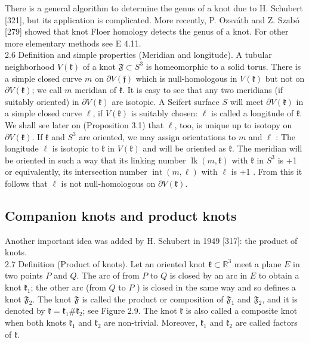 \documentclass[10pt, letterpaper]{article}
\begin{document}
There is a general algorithm to determine the genus of a knot due to H. Schubert [321], but its application is complicated. More recently, P. Ozsváth and Z. Szabó [279] showed that knot Floer homology detects the genus of a knot. For other more elementary methods see E 4.11.\\
2.6 Definition and simple properties (Meridian and longitude). A tubular neighborhood $V(\mathfrak{k})$ of a knot $\mathfrak{F} \subset S^{3}$ is homeomorphic to a solid torus. There is a simple closed curve $m$ on $\partial V(\mathfrak{f})$ which is null-homologous in $V(\mathfrak{k})$ but not on $\partial V(\mathfrak{k})$; we call $m$ meridian of $\mathfrak{k}$. It is easy to see that any two meridians (if suitably oriented) in $\partial V(\mathfrak{k})$ are isotopic. A Seifert surface $S$ will meet $\partial V(\mathfrak{k})$ in a simple closed curve $\ell$, if $V(\mathfrak{k})$ is suitably chosen: $\ell$ is called a longitude of $\mathfrak{k}$. We shall see later on (Proposition 3.1) that $\ell$, too, is unique up to isotopy on $\partial V(\mathfrak{k})$. If $\mathfrak{k}$ and $S^{3}$ are oriented, we may assign orientations to $m$ and $\ell$ : The longitude $\ell$ is isotopic to $\mathfrak{k}$ in $V(\mathfrak{k})$ and will be oriented as $\mathfrak{k}$. The meridian will be oriented in such a way that its linking number $\operatorname{lk}(m, \mathfrak{k})$ with $\mathfrak{k}$ in $S^{3}$ is +1 or equivalently, its intersection number $\operatorname{int}(m, \ell)$ with $\ell$ is +1 . From this it follows that $\ell$ is not null-homologous on $\partial V(\mathfrak{k})$.

\subsection{Companion knots and product knots}
Another important idea was added by H. Schubert in 1949 [317]: the product of knots.\\
2.7 Definition (Product of knots). Let an oriented knot $\mathfrak{k} \subset \mathbb{R}^{3}$ meet a plane $E$ in two points $P$ and $Q$. The arc of from $P$ to $Q$ is closed by an arc in $E$ to obtain a knot $\mathfrak{k}_{1}$; the other arc (from $Q$ to $P$ ) is closed in the same way and so defines a knot $\mathfrak{F}_{2}$. The knot $\mathfrak{F}$ is called the product or composition of $\mathfrak{F}_{1}$ and $\mathfrak{F}_{2}$, and it is denoted by $\mathfrak{k}=\mathfrak{k}_{1} \# \mathfrak{k}_{2}$; see Figure 2.9. The knot $\mathfrak{k}$ is also called a composite knot when both knots $\mathfrak{k}_{1}$ and $\mathfrak{k}_{2}$ are non-trivial. Moreover, $\mathfrak{k}_{1}$ and $\mathfrak{k}_{2}$ are called factors of $\mathfrak{k}$.
\end{document}
